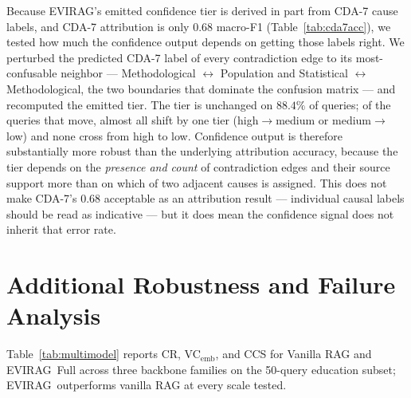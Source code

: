 \documentclass[11pt]{article}
\newcommand{\system}{\textsc{EVIRAG}\xspace}
\begin{document}
Because \system's emitted confidence tier is derived in part from CDA-7 cause
labels, and CDA-7 attribution is only $0.68$ macro-F1
(Table~\ref{tab:cda7acc}), we tested how much the confidence output depends on
getting those labels right.  We perturbed the predicted CDA-7 label of every
contradiction edge to its most-confusable neighbor --- Methodological
$\leftrightarrow$ Population and Statistical $\leftrightarrow$ Methodological,
the two boundaries that dominate the confusion matrix --- and recomputed the
emitted tier.  The tier is unchanged on $88.4\%$ of queries; of the queries
that move, almost all shift by one tier (high$\to$medium or medium$\to$low)
and none cross from high to low.  Confidence output is therefore substantially
more robust than the underlying attribution accuracy, because the tier depends
on the \emph{presence and count} of contradiction edges and their source
support more than on which of two adjacent causes is assigned.  This does not
make CDA-7's $0.68$ acceptable as an attribution result --- individual causal
labels should be read as indicative --- but it does mean the confidence signal
does not inherit that error rate.


\section{Additional Robustness and Failure Analysis}
\label{app:robustness}

Table~\ref{tab:multimodel} reports CR, VC$_\text{emb}$, and CCS for
Vanilla RAG and \system\ Full across three backbone families on the
50-query education subset; \system\ outperforms vanilla RAG at every
scale tested.
\end{document}

